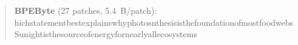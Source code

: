 \begin{quote}
\textbf{BPEByte} (27 patches, 5.4~B/patch):\\[1pt]
\allowbreak{}h\allowbreak{}i\allowbreak{}c\allowbreak{}h\allowbreak{}\bb{\textvisiblespace{}}\allowbreak{}s\allowbreak{}t\allowbreak{}a\allowbreak{}t\allowbreak{}e\allowbreak{}m\allowbreak{}e\allowbreak{}n\allowbreak{}t\allowbreak{}\bb{\textvisiblespace{}}\allowbreak{}b\allowbreak{}e\allowbreak{}s\allowbreak{}t\allowbreak{}\bb{\textvisiblespace{}}\allowbreak{}e\allowbreak{}x\allowbreak{}p\allowbreak{}l\allowbreak{}a\allowbreak{}i\allowbreak{}n\allowbreak{}s\allowbreak{}\bb{\textvisiblespace{}}\allowbreak{}w\allowbreak{}h\allowbreak{}y\allowbreak{}\bb{\textvisiblespace{}}\allowbreak{}p\allowbreak{}h\allowbreak{}o\allowbreak{}t\allowbreak{}o\allowbreak{}s\allowbreak{}\allowbreak{}n\allowbreak{}t\allowbreak{}h\allowbreak{}e\allowbreak{}s\allowbreak{}i\allowbreak{}s\allowbreak{}\bb{\textvisiblespace{}}\allowbreak{}i\allowbreak{}s\allowbreak{}\bb{\textvisiblespace{}}\allowbreak{}t\allowbreak{}h\allowbreak{}e\allowbreak{}\bb{\textvisiblespace{}}\allowbreak{}f\allowbreak{}o\allowbreak{}u\allowbreak{}n\allowbreak{}d\allowbreak{}a\allowbreak{}t\allowbreak{}i\allowbreak{}o\allowbreak{}n\allowbreak{}\bb{\textvisiblespace{}}\allowbreak{}o\allowbreak{}f\allowbreak{}\bb{\textvisiblespace{}}\allowbreak{}m\allowbreak{}o\allowbreak{}s\allowbreak{}t\allowbreak{}\bb{\textvisiblespace{}}\allowbreak{}f\allowbreak{}o\allowbreak{}o\allowbreak{}d\allowbreak{}\bb{\textvisiblespace{}}\allowbreak{}w\allowbreak{}e\allowbreak{}b\allowbreak{}s\allowbreak{}\allowbreak{}\bb{\textvisiblespace{}}\allowbreak{}S\allowbreak{}u\allowbreak{}n\allowbreak{}\allowbreak{}i\allowbreak{}g\allowbreak{}h\allowbreak{}t\allowbreak{}\bb{\textvisiblespace{}}\allowbreak{}i\allowbreak{}s\allowbreak{}\bb{\textvisiblespace{}}\allowbreak{}t\allowbreak{}h\allowbreak{}e\allowbreak{}\bb{\textvisiblespace{}}\allowbreak{}s\allowbreak{}o\allowbreak{}u\allowbreak{}r\allowbreak{}c\allowbreak{}e\allowbreak{}\bb{\textvisiblespace{}}\allowbreak{}o\allowbreak{}f\allowbreak{}\bb{\textvisiblespace{}}\allowbreak{}e\allowbreak{}n\allowbreak{}e\allowbreak{}r\allowbreak{}g\allowbreak{}y\allowbreak{}\bb{\textvisiblespace{}}\allowbreak{}f\allowbreak{}o\allowbreak{}r\allowbreak{}\bb{\textvisiblespace{}}\allowbreak{}n\allowbreak{}e\allowbreak{}a\allowbreak{}r\allowbreak{}l\allowbreak{}y\allowbreak{}\bb{\textvisiblespace{}}\allowbreak{}a\allowbreak{}l\allowbreak{}l\allowbreak{}\bb{\textvisiblespace{}}\allowbreak{}e\allowbreak{}c\allowbreak{}o\allowbreak{}s\allowbreak{}y\allowbreak{}s\allowbreak{}t\allowbreak{}e\allowbreak{}m\allowbreak{}s\allowbreak{}\allowbreak{}\\[6pt]

\end{quote}
